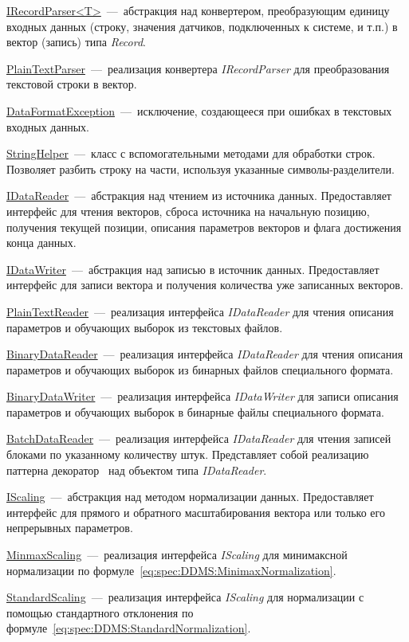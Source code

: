 \uline{IRecordParser<T>}~---~абстракция над конвертером, преобразующим единицу входных данных (строку, значения датчиков, подключенных к системе, и т.п.) в вектор (запись) типа \textit{Record}.

\uline{PlainTextParser}~---~реализация конвертера \textit{IRecordParser} для преобразования текстовой строки в вектор.

\uline{DataFormatException}~---~исключение, создающееся при ошибках в текстовых входных данных.

\uline{StringHelper}~---~класс с вспомогательными методами для обработки строк. Позволяет разбить строку на части, используя указанные символы-разделители.

\uline{IDataReader}~---~абстракция над чтением из источника данных. Предоставляет интерфейс для чтения векторов, сброса источника на начальную позицию, получения текущей позиции, описания параметров векторов и флага достижения конца данных.

\uline{IDataWriter}~---~абстракция над записью в источник данных. Предоставляет интерфейс для записи вектора и получения количества уже записанных векторов.

\uline{PlainTextReader}~---~реализация интерфейса \textit{IDataReader} для чтения описания параметров и обучающих выборок из текстовых файлов.

\uline{BinaryDataReader}~---~реализация интерфейса \textit{IDataReader} для чтения описания параметров и обучающих выборок из бинарных файлов специального формата.

\uline{BinaryDataWriter}~---~реализация интерфейса \textit{IDataWriter} для записи описания параметров и обучающих выборок в бинарные файлы специального формата.

\uline{BatchDataReader}~---~реализация интерфейса \textit{IDataReader} для чтения записей блоками по указанному количеству штук. Представляет собой реализацию паттерна декоратор~\cite{GangOfFourDesignPatterns} над объектом типа \textit{IDataReader}.

\uline{IScaling}~---~абстракция над методом нормализации данных. Предоставляет интерфейс для прямого и обратного масштабирования вектора или только его непрерывных параметров.

\uline{MinmaxScaling}~---~реализация интерфейса \textit{IScaling} для минимаксной нормализации по формуле~\eqref{eq:spec:DDMS:MinimaxNormalization}.

\uline{StandardScaling}~---~реализация интерфейса \textit{IScaling} для нормализации с помощью стандартного отклонения по формуле~\eqref{eq:spec:DDMS:StandardNormalization}.


